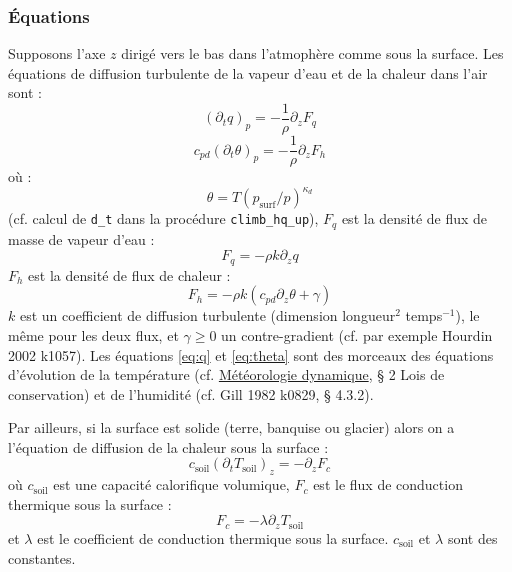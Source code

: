 \documentclass[a4paper,english,french]{article}
\begin{document}
\subsubsection{Équations}

Supposons l'axe $z$ dirigé vers le bas dans l'atmophère comme sous la
surface. Les équations de diffusion turbulente de la vapeur d'eau et de la
chaleur dans l'air sont :
\begin{equation}
  \label{eq:q}
  (\partial_t q)_p = - \frac{1}{\rho} \partial_z F_q
\end{equation}
\begin{equation}
  \label{eq:theta}
  c_{pd} (\partial_t \theta)_p = - \frac{1}{\rho} \partial_z F_h
\end{equation}
où :
\begin{equation*}
  \theta = T (p_\mathrm{surf} / p)^{\kappa_d}
\end{equation*}
(cf. calcul de \verb+d_t+ dans la procédure \verb+climb_hq_up+), $F_q$
est la densité de flux de masse de vapeur d'eau :
\begin{equation*}
  F_q = - \rho k \partial_z q
\end{equation*}
$F_h$ est la densité de flux de chaleur :
\begin{equation*}
  F_h = - \rho k (c_{pd} \partial_z \theta + \gamma)
\end{equation*}
$k$ est un coefficient de diffusion turbulente (dimension longueur$^2$
temps$^{-1}$), le même pour les deux flux, et $\gamma \ge 0$ un
contre-gradient (cf. par exemple Hourdin 2002 k1057). Les équations
\ref{eq:q} et \ref{eq:theta} sont des morceaux des équations
d'évolution de la température
(cf. \href{../../../../Apprentissage/Dynamic_meteorology_texfol/dynamic_meteorology.pdf}{Météorologie
  dynamique}, § 2 \og Lois de conservation\fg{}) et de l'humidité
(cf. Gill 1982 k0829, § 4.3.2).

Par ailleurs, si la surface est solide (terre, banquise ou glacier)
alors on a l'équation de diffusion de la chaleur sous la surface :
\begin{equation}
  \label{eq:diffusion_soil}
  c_\mathrm{soil} (\partial_t T_\mathrm{soil})_z = - \partial_z F_c
\end{equation}
où $c_\mathrm{soil}$ est une capacité calorifique volumique, $F_c$
est le flux de conduction thermique sous la surface :
\begin{equation*}
  F_c = - \lambda \partial_z T_\mathrm{soil}
\end{equation*}
et $\lambda$ est le coefficient de conduction thermique sous la
surface. $c_\mathrm{soil}$ et $\lambda$ sont des constantes.
\end{document}
